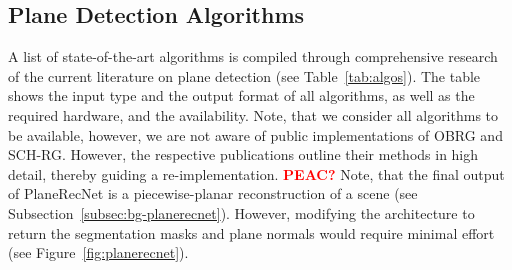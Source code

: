 \documentclass[main.tex]{subfiles}
\begin{document}
\subsection{Plane Detection Algorithms}
\label{subsec:pdaselect}
A list of state-of-the-art algorithms is compiled through comprehensive research of the current literature on plane detection (see Table~\ref{tab:algos}).
The table shows the input type and the output format of all algorithms, as well as the required hardware, and the availability.
Note, that we consider all algorithms to be available, however, we are not aware of public implementations of OBRG and SCH-RG.
However, the respective publications outline their methods in high detail, thereby guiding a re-implementation.
\textbf{\textcolor{red}{PEAC?}}
Note, that the final output of PlaneRecNet is a piecewise-planar reconstruction of a scene (see Subsection~\ref{subsec:bg-planerecnet}).
However, modifying the architecture to return the segmentation masks and plane normals would require minimal
effort (see Figure~\ref{fig:planerecnet}).
\end{document}
